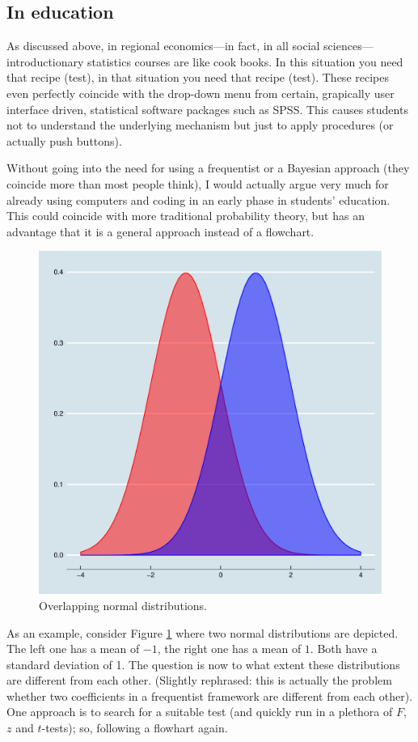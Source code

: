 \documentclass[fleqn,10pt]{SelfArx} %
\begin{document}
\subsection{In education}

As discussed above, in regional economics---in fact, in all social sciences---introductionary
statistics courses are like cook books. In this situation you need that recipe
(test), in that situation you need that recipe (test). These recipes even
perfectly coincide with the drop-down menu from certain, grapically user
interface driven, statistical software packages such as SPSS. This causes
students not to understand the underlying mechanism but just to apply procedures
(or actually push buttons).  

Without going into the need for using a frequentist or a Bayesian approach (they
coincide more than most people think), I would actually argue very much for
already using computers and coding in an early phase in students' education.
This could coincide with more traditional probability theory, but has an
advantage that it is a general approach instead of a flowchart.

\begin{figure}[t!]\centering 
  \includegraphics[width=\columnwidth]{./figures/normal}
  \caption{Overlapping normal distributions.}
	\label{fig:normal}
\end{figure}
As an example, consider Figure \ref{fig:normal} where two normal distributions
are depicted. The left one has a mean of $-1$, the right one has a mean of $1$.
Both have a standard deviation of 1. The question is now to what extent these
distributions are different from each other. (Slightly rephrased: this is actually the problem whether
two coefficients in a frequentist framework are different from each other). One
approach is to search for a suitable test (and quickly run in a plethora of $F$,
$z$ and $t$-tests); so, following a flowhart again.
\end{document}
